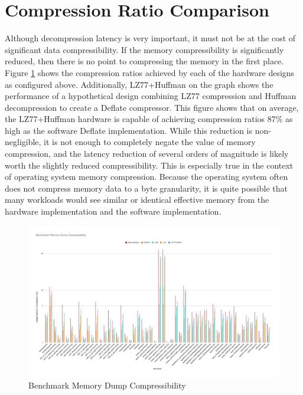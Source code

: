 \documentclass[doublespace,nopageskip]{VTthesis}
\begin{document}
\section{Compression Ratio Comparison}\label{se:compression_ratio_comparison}
Although decompression latency is very important, it must not be at the cost of significant data compressibility. If the memory compressibility is significantly reduced, then there is no point to compressing the memory in the first place. Figure \ref{fig:benchmark_memory_dump_compressibility} shows the compression ratios achieved by each of the hardware designs as configured above. Additionally, LZ77+Huffman on the graph shows the performance of a hypothetical design combining LZ77 compression and Huffman decompression to create a Deflate compressor. This figure shows that on average, the LZ77+Huffman hardware is capable of achieving compression ratios 87\% as high as the software Deflate implementation. While this reduction is non-negligible, it is not enough to completely negate the value of memory compression, and the latency reduction of several orders of magnitude is likely worth the slightly reduced compressibility. This is especially true in the context of operating system memory compression. Because the operating system often does not compress memory data to a byte granularity, it is quite possible that many workloads would see similar or identical effective memory from the hardware implementation and the software implementation.

\begin{figure}[htb]
	\centering
	\includegraphics[scale=0.24]{Benchmark Memory Dump Compressibility.png}
	\caption{Benchmark Memory Dump Compressibility}
	\label{fig:benchmark_memory_dump_compressibility}
\end{figure}
\end{document}
